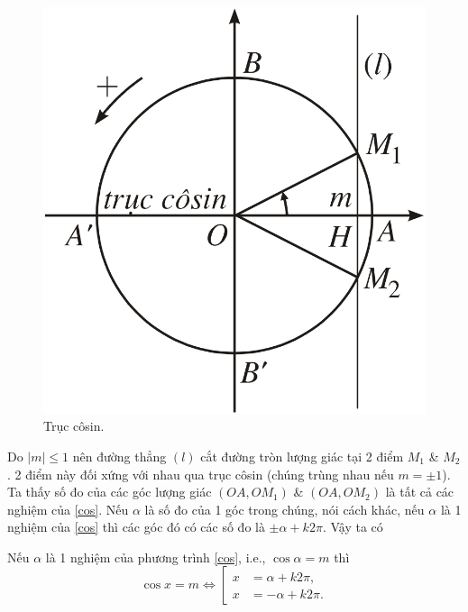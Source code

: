 \documentclass[oneside]{book}
\numberwithin{equation}{section}
\begin{document}
\begin{figure}[H]
	\centering
	\includegraphics[scale=0.15]{truc_cos}
	\caption{Trục côsin.}
	\label{fig:truc cos}
\end{figure}
Do $|m|\le 1$ nên đường thẳng $(l)$ cắt đường tròn lượng giác tại 2 điểm $M_1$ \& $M_2$. 2 điểm này đối xứng với nhau qua trục côsin (chúng trùng nhau nếu $m = \pm 1$). Ta thấy số đo của các góc lượng giác $(OA,OM_1)$ \& $(OA,OM_2)$ là tất cả các nghiệm của \eqref{cos}. Nếu $\alpha$ là số đo của 1 góc trong chúng, nói cách khác, nếu $\alpha$ là 1 nghiệm của \eqref{cos} thì các góc đó có các số đo là $\pm\alpha + k2\pi$. Vậy ta có

\begin{tcolorbox}
	Nếu $\alpha$ là 1 nghiệm của phương trình \eqref{cos}, i.e., $\cos\alpha = m$ thì
	\begin{equation}
		\label{root cos}
		\cos x = m\Leftrightarrow\left[\begin{split}
			x &= \alpha + k2\pi,\\
			x &= -\alpha + k2\pi.
		\end{split}\right.
	\end{equation}
\end{tcolorbox}
\end{document}
